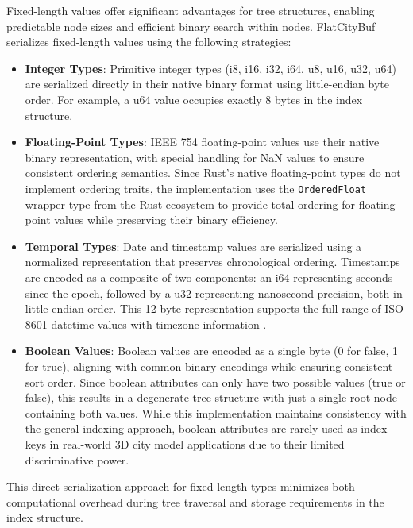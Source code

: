Fixed-length values offer significant advantages for tree structures, enabling predictable node sizes and efficient binary search within nodes. FlatCityBuf serializes fixed-length values using the following strategies:

\begin{itemize}
\item \textbf{Integer Types}: Primitive integer types (i8, i16, i32, i64, u8, u16, u32, u64) are serialized directly in their native binary format using little-endian byte order. For example, a u64 value occupies exactly 8 bytes in the index structure.

\item \textbf{Floating-Point Types}: IEEE 754 floating-point values \citep{ieee_754_2023} use their native binary representation, with special handling for NaN values to ensure consistent ordering semantics. Since Rust's native floating-point types do not implement ordering traits, the implementation uses the \texttt{OrderedFloat} wrapper type from the Rust ecosystem to provide total ordering for floating-point values while preserving their binary efficiency.

\item \textbf{Temporal Types}: Date and timestamp values are serialized using a normalized representation that preserves chronological ordering. Timestamps are encoded as a composite of two components: an i64 representing seconds since the epoch, followed by a u32 representing nanosecond precision, both in little-endian order. This 12-byte representation supports the full range of ISO 8601 datetime values with timezone information \citep{iso_8601_2023}.
\item \textbf{Boolean Values}: Boolean values are encoded as a single byte (0 for false, 1 for true), aligning with common binary encodings while ensuring consistent sort order. Since boolean attributes can only have two possible values (true or false), this results in a degenerate tree structure with just a single root node containing both values. While this implementation maintains consistency with the general indexing approach, boolean attributes are rarely used as index keys in real-world 3D city model applications due to their limited discriminative power.
\end{itemize}

This direct serialization approach for fixed-length types minimizes both computational overhead during tree traversal and storage requirements in the index structure.

